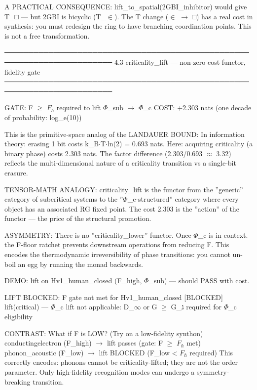 \documentclass[12pt,a4paper]{article}
\begin{document}
A PRACTICAL CONSEQUENCE:
lift\_to\_spatial(2GBI\_inhibitor) would give T\_□ --- but 2GBI is
bicyclic (T\_$\in$). The T change ($\in$ $\rightarrow$ □) has a real cost in synthesis:
you must redesign the ring to have branching coordination points.
This is not a free transformation.

────────────────────────────────────────────────────────────────────────
4.3  criticality\_lift --- non-zero cost functor, fidelity gate
────────────────────────────────────────────────────────────────────────

GATE:  F $\geq$ $F_{\hbar}$ required to lift $\Phi$\_sub $\rightarrow$ $\Phi$\_c
COST:  +2.303 nats (one decade of probability: log\_e(10))

This is the primitive-space analog of the LANDAUER BOUND:
In information theory: erasing 1 bit costs k\_B$\cdot$T$\cdot$ln(2) = 0.693 nats.
Here: acquiring criticality (a binary phase) costs 2.303 nats.
The factor difference (2.303/0.693 $\approx$ 3.32) reflects the multi-dimensional
nature of a criticality transition vs a single-bit erasure.

TENSOR-MATH ANALOGY:
criticality\_lift is the functor from the ''generic'' category of
subcritical systems to the ''$\Phi$\_c-structured'' category where every
object has an associated RG fixed point. The cost 2.303 is the
''action'' of the functor --- the price of the structural promotion.

ASYMMETRY:
There is no ''criticality\_lower'' functor. Once $\Phi$\_c is in context.
the F-floor ratchet prevents downstream operations from reducing F.
This encodes the thermodynamic irreversibility of phase transitions:
you cannot un-boil an egg by running the monad backwards.

DEMO: lift on Hv1\_human\_closed (F\_high, $\Phi$\_sub) --- should PASS with cost.

LIFT BLOCKED: F gate not met for Hv1\_human\_closed
{[}BLOCKED{]}  lift(critical)  --- $\Phi$\_c lift not applicable: D\_$\infty$ or G $\geq$ G\_ג required for $\Phi$\_c eligibility

CONTRAST: What if F is LOW? (Try on a low-fidelity synthon)
conductingelectron (F\_high) $\rightarrow$ lift passes  (gate: F $\geq$ $F_{\hbar}$ met)
phonon\_acoustic   (F\_low)  $\rightarrow$ lift BLOCKED  (F\_low \textless{} $F_{\hbar}$ required)
This correctly encodes: phonons cannot be criticality-lifted; they are
not the order parameter. Only high-fidelity recognition modes can
undergo a symmetry-breaking transition.
\end{document}
